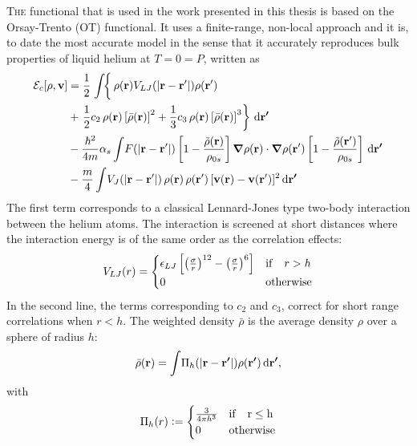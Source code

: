 		\lettrine[lines=3,findent=3pt,nindent=0pt]{T}{he} functional that is used in the work presented in this thesis is based on the Orsay-Trento (OT) functional\citep{Dalfovo1995}. It uses a finite-range, non-local approach and it is, to date the most accurate model in the sense that it accurately reproduces bulk properties of liquid helium at $T=0=P$, written as		
		\begin{align}
			{\cal E}_c[\rho ,\mathbf{v}] &=  
			\frac{1}{2} \left.\int \! \right\{\rho({\bf r}) V_{LJ}(|{\bf r}-{\bf r'}|) \rho({\bf r'}) \nonumber \\
			&+ \left.\frac{1}{2} c_2\, \rho({\bf r}) \left[{\bar \rho}({\bf r}) \right]^2 
			+ \frac{1}{3} c_3 \, \rho({\bf r}) \left[ {\bar \rho}({\bf r}) \right]^3\right\}\,\mathrm{d}{\bm{\mathrm{r'}}} \nonumber \\
			&- \frac{\hbar^2}{4m} \alpha_s \int \! F(|{\bf r}-{\bf r'}|) \left[ 1- \frac{{\tilde \rho}({\bf r})}{\rho_{0s}} \right]\grad{\rho({\bf r})} \cdot \grad{\rho({\bf r'})} \left[ 1- \frac{{\tilde \rho}({\bf r'})}{\rho_{0s}} \right]\,\mathrm{d}{\bm{\mathrm{r'}}} \nonumber \\
			& - \frac{m}{4} \int \! V_J(| \mathbf{r} - \mathbf{r}'|)\, \rho(\mathbf{r}) \, \rho(\mathbf{r}')\,  [\mathbf{v}(\mathbf{r})-\mathbf{v}(\mathbf{r}')]^2\,\mathrm{d}{\bm{\mathrm{r'}}} \label{eq:otf}
		\end{align}
		The first term corresponds to a classical Lennard-Jones type two-body interaction between the helium atoms. The interaction is screened at short distances where the interaction energy is of the same order as the correlation effects:
		\begin{align}
			V_{LJ}(r) = \begin{cases}
			\epsilon_{LJ} \left[\left(\frac{\sigma}{r} \right)^{12} - \left(\frac{\sigma}{r} \right)^{6} \right] & {\rm if} \quad r > h \\
			0 & {\rm otherwise}
			\end{cases}\label{eq9}
		\end{align}
		In the second line, the terms corresponding to $c_2$ and $c_3$, correct for short range correlations when $r<h$. The weighted density $\bar{\rho}$ is the average density $\rho$ over a sphere of radius $h$:
		\begin{align}
			\bar{\rho}(\bm{\mathrm{r}}) = \int\!\Pi_h\qty(\abs{\bm{\mathrm{r}}-\bm{\mathrm{r'}}})\rho({\bm{\mathrm{r'}}})\,\mathrm{d}{\bm{\mathrm{r'}}},
		\end{align}
		with
		\begin{align}
			\Pi_h(r) \vcentcolon= \begin{cases}
				\frac{3}{4\pi h^3} & \rm{if} \quad r\leq h \\
				0 & \rm{otherwise}
			\end{cases}
		\end{align}
